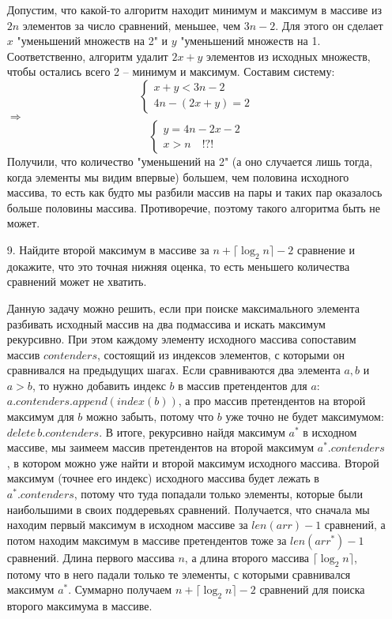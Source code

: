 \begin{enumerate}
\begin{solution}
        Допустим, что какой-то алгоритм находит минимум и максимум в массиве из $2n$ элементов за число сравнений, меньшее, чем $3n-2$. Для этого он сделает $x$ "уменьшений множеств на 2" и $y$ "уменьшений множеств на 1. Соответственно, алгоритм удалит $2x+y$ элементов из исходных множеств, чтобы остались всего 2 -- минимум и максимум. Составим систему:
        \begin{equation}
            \begin{cases}
                x+y<3n-2 \\
                4n-(2x+y)=2
            \end{cases}
        \end{equation} $\Rightarrow$
        \begin{equation}
            \begin{cases}
                y=4n-2x-2 \\
                x>n \quad !?!
            \end{cases}
        \end{equation}
        Получили, что количество "уменьшений на 2" (а оно случается лишь тогда, когда элементы мы видим впервые) большем, чем половина исходного массива, то есть как будто мы разбили массив на пары и таких пар оказалось больше половины массива. Противоречие, поэтому такого алгоритма быть не может.
    \end{solution}
        
    \item[9.] Найдите второй максимум в массиве за $n + \lceil \log_2 n \rceil- 2$ сравнение и докажите, что это точная нижняя оценка, то есть меньшего количества сравнений может не хватить.
    \begin{solution}
        Данную задачу можно решить, если при поиске максимального элемента разбивать исходный массив на два подмассива и искать максимум рекурсивно. При этом каждому элементу исходного массива сопоставим массив $contenders$, состоящий из индексов элементов, с которыми он сравнивался на предыдущих шагах. Если сравниваются два элемента $a, b$ и $a > b$, то нужно добавить индекс $b$ в массив претендентов для $a$: $a.contenders.append(index(b))$, а про массив претендентов на второй максимум для $b$ можно забыть, потому что $b$ уже точно не будет максимумом: $delete\, b.contenders$. В итоге, рекурсивно найдя максимум $a^*$ в исходном массиве, мы заимеем массив претендентов на второй максимум $a^*.contenders$, в котором можно уже найти и второй максимум исходного массива. Второй максимум (точнее его индекс) исходного массива будет лежать в $a^*.contenders$, потому что туда попадали только элементы, которые были наибольшими в своих поддеревьях сравнений. Получается, что сначала мы находим первый максимум в исходном массиве за $len(arr)-1$ сравнений, а потом находим максимум в массиве претендентов тоже за $len(arr^*)-1$ сравнений. Длина первого массива $n$, а длина второго массива $\lceil \log_2 n \rceil$, потому что в него падали только те элементы, с которыми сравнивался максимум $a^*$. Суммарно получаем $n + \lceil \log_2 n \rceil - 2$ сравнений для поиска второго максимума в массиве.


\end{solution}
\end{enumerate}
